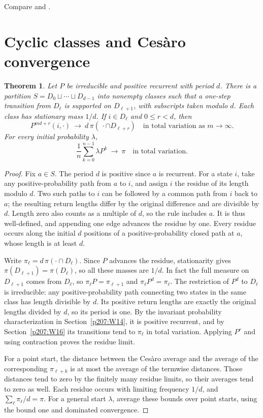 \documentclass[11pt,oneside,openany]{book}
\theoremstyle{plain}
\newtheorem{theorem}{Theorem}[chapter]
\theoremstyle{definition}
\theoremstyle{remark}
\begin{document}
Compare \cite[Theorems 1.8.3--1.8.5]{Norris} and
\cite[Section 5.6]{Durrett}.

\section{Cyclic classes and Ces\`aro convergence}\label{p207:W17}

\begin{theorem}
Let \(P\) be irreducible and positive recurrent with period \(d\).
There is a partition \(S=D_0\sqcup\cdots\sqcup D_{d-1}\) into nonempty
classes such that a one-step transition from \(D_\ell\) is
supported on \(D_{\ell+1}\), with subscripts taken modulo \(d\).
Each class has stationary mass \(1/d\). If \(i\in D_\ell\) and
\(0\le r<d\), then
\[
 P^{md+r}(i,\cdot)\ \longrightarrow\
       d\,\pi(\,\cdot\cap D_{\ell+r})
 \quad\text{in total variation as }m\to\infty.
\]
For every initial probability \(\lambda\),
\[
 \frac1n\sum_{k=0}^{n-1}\lambda P^k
 \ \longrightarrow\ \pi
 \quad\text{in total variation}.
\]
\end{theorem}
\begin{proof}
Fix \(a\in S\). The period \(d\) is positive since \(a\) is recurrent.
For a state \(i\), take any positive-probability path from \(a\) to
\(i\), and assign \(i\) the residue of its length modulo \(d\).
Two such paths to \(i\) can be followed by a common path from \(i\)
back to \(a\); the resulting return lengths differ by the original
difference and are divisible by \(d\). Length zero also counts as
a multiple of \(d\), so the rule includes \(a\).
It is thus well-defined, and appending one edge advances the residue
by one. Every residue occurs along the initial \(d\) positions of
a positive-probability closed path at \(a\), whose length is at least
\(d\).

Write \(\pi_\ell=d\,\pi(\cdot\cap D_\ell)\). Since \(P\) advances
the residue, stationarity gives
\(\pi(D_{\ell+1})=\pi(D_\ell)\), so all these masses are \(1/d\).
In fact the full measure on \(D_{\ell+1}\) comes from \(D_\ell\),
so \(\pi_\ell P=\pi_{\ell+1}\) and \(\pi_\ell P^d=\pi_\ell\).
The restriction of \(P^d\) to \(D_\ell\) is irreducible:
any positive-probability path connecting two states in the same
class has length divisible by \(d\).
Its positive return lengths are exactly the original lengths
divided by \(d\), so its period is one. By the invariant
probability characterization in Section~\ref{p207:W14}, it is
positive recurrent, and by Section~\ref{p207:W16} its transitions
tend to \(\pi_\ell\) in total variation. Applying \(P^r\) and
using contraction proves the residue limit.

For a point start, the distance between the Ces\`aro average
and the average of the corresponding \(\pi_{\ell+k}\) is at
most the average of the termwise distances. Those distances
tend to zero by the finitely many residue limits, so their
averages tend to zero as well. Each residue occurs with limiting
frequency \(1/d\), and \(\sum_\ell\pi_\ell/d=\pi\).
For a general start \(\lambda\), average these bounds over point
starts, using the bound one and dominated convergence.
\end{proof}
\end{document}
